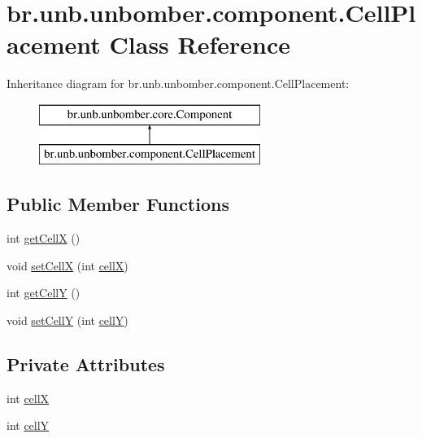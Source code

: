 \hypertarget{classbr_1_1unb_1_1unbomber_1_1component_1_1_cell_placement}{\section{br.\+unb.\+unbomber.\+component.\+Cell\+Placement Class Reference}
\label{classbr_1_1unb_1_1unbomber_1_1component_1_1_cell_placement}
}
Inheritance diagram for br.\+unb.\+unbomber.\+component.\+Cell\+Placement\+:\begin{figure}[H]
\begin{center}
\leavevmode
\includegraphics[height=2.000000cm]{classbr_1_1unb_1_1unbomber_1_1component_1_1_cell_placement}
\end{center}
\end{figure}
\subsection*{Public Member Functions}
\begin{DoxyCompactItemize}
\item 
int \hyperlink{classbr_1_1unb_1_1unbomber_1_1component_1_1_cell_placement_a5173dfeda7ef6e996638f9aeda662cf4}{get\+Cell\+X} ()
\item 
void \hyperlink{classbr_1_1unb_1_1unbomber_1_1component_1_1_cell_placement_a3f38fa5e74893ad16ca2f3565ee5b8b6}{set\+Cell\+X} (int \hyperlink{classbr_1_1unb_1_1unbomber_1_1component_1_1_cell_placement_af2c47f0b76bdf95d8682f9556ecae8db}{cell\+X})
\item 
int \hyperlink{classbr_1_1unb_1_1unbomber_1_1component_1_1_cell_placement_a471cc1de766da4dfed122ac72d6f1afd}{get\+Cell\+Y} ()
\item 
void \hyperlink{classbr_1_1unb_1_1unbomber_1_1component_1_1_cell_placement_a4713039c3731fc1034b4402acba4e3d6}{set\+Cell\+Y} (int \hyperlink{classbr_1_1unb_1_1unbomber_1_1component_1_1_cell_placement_a1fb5997494cec8873f98339aa5e7b41d}{cell\+Y})
\end{DoxyCompactItemize}
\subsection*{Private Attributes}
\begin{DoxyCompactItemize}
\item 
int \hyperlink{classbr_1_1unb_1_1unbomber_1_1component_1_1_cell_placement_af2c47f0b76bdf95d8682f9556ecae8db}{cell\+X}
\item 
int \hyperlink{classbr_1_1unb_1_1unbomber_1_1component_1_1_cell_placement_a1fb5997494cec8873f98339aa5e7b41d}{cell\+Y}
\end{DoxyCompactItemize}



